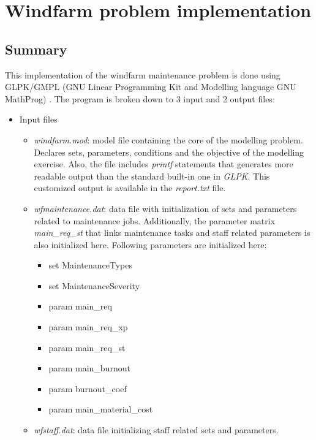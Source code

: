 \section{Windfarm problem implementation}
    \subsection{Summary}
    This implementation of the windfarm maintenance problem is done using GLPK/GMPL
    (GNU Linear Programming Kit and Modelling language GNU MathProg) \cite{glpk}. The program is broken down to
    3 input and 2 output files:
    \begin{itemize}
        \item Input files
            \begin{itemize}
                \item \textit{windfarm.mod}: model file containing the core of the modelling problem.
                Declares sets, parameters, conditions and the objective of the modelling exercise.
                Also, the file includes \textit{printf} statements that generates more readable output
                than the standard built-in one in \textit{GLPK}. This customized output is available in 
                the \textit{report.txt} file.
                \item \textit{wfmaintenance.dat}: data file with initialization of sets and parameters 
                related to maintenance jobs. Additionally, the parameter matrix \textit{main\_req\_st} 
                that links maintenance tasks and staff related parameters is also initialized here.
                Following parameters are initialized here:
                \begin{itemize}
                    \item set MaintenanceTypes
                    \item set MaintenanceSeverity
                    \item param main\_req
                    \item param main\_req\_xp
                    \item param main\_req\_st
                    \item param main\_burnout
                    \item param burnout\_coef
                    \item param main\_material\_cost
                \end{itemize}
                \item \textit{wfstaff.dat}: data file initializing staff related sets and parameters.

\end{itemize}
\end{itemize}
